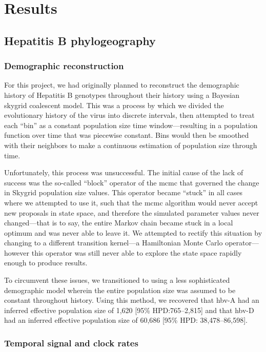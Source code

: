 \chapter{Results}\label{ch:results}

\section{Hepatitis B phylogeography}

\subsection{Demographic reconstruction}

For this project, we had originally planned to reconstruct the demographic history of Hepatitis B genotypes throughout their history using a Bayesian skygrid coalescent model.
This was a process by which we divided the evolutionary history of the virus into discrete intervals, then attempted to treat each ``bin'' as a constant population size time window---resulting in a population function over time that was piecewise constant.
Bins would then be smoothed with their neighbors to make a continuous estimation of population size through time.

Unfortunately, this process was unsuccessful.
The initial cause of the lack of success was the so-called ``block'' operator of the \gls{mcmc} that governed the change in Skygrid population size values.
This operator became ``stuck'' in all cases where we attempted to use it, such that the \gls{mcmc} algorithm would never accept new proposals in state space, and therefore the simulated parameter values never changed---that is to say, the entire Markov chain became stuck in a local optimum and was never able to leave it.
We attempted to rectify this situation by changing to a different transition kernel---a Hamiltonian Monte Carlo operator---however this operator was still never able to explore the state space rapidly enough to produce results.

To circumvent these issues, we transitioned to using a less sophisticated demographic model wherein the entire population size was assumed to be constant throughout history.
Using this method, we recovered that \gls{hbv}-A had an inferred effective population size of 1,620 [95\% HPD:765--2,815] and that \gls{hbv}-D had an inferred effective population size of 60,686 [95\% HPD: 38,478--86,598].

\subsection{Temporal signal and clock rates}

